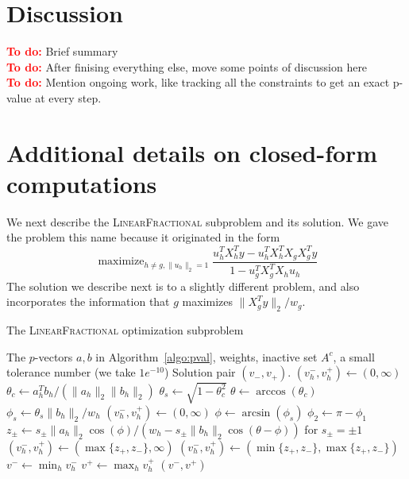 \documentclass{imsart}
\newcommand{\maximize}{\mathop{\mathrm{maximize}}}
\newcommand{\todo}{\textcolor{red}{\textbf{To do: }}}
\newcommand{\norm}[1]{\lVert #1 \rVert}
\begin{document}




\section{Discussion}
\label{sec:discuss}

\todo Brief summary \\
\todo After finising everything else, move some points of discussion
here \\
\todo Mention ongoing work, like tracking all the constraints to
get an exact p-value at every step. \\

\newpage


%


\newpage

\appendix
\section{Additional details on closed-form computations}
\label{app:closedform}

We next describe the \textsc{LinearFractional} subproblem and its solution. We
gave the problem this name because it originated in the form
\[
\maximize_{h \neq g, \norm{u_h}_2 = 1} \frac{u_h^TX_h^Ty - u_h^TX_h^TX_gX_g^Ty}
{1 - u_g^TX_g^TX_hu_h}
\]
The solution we describe next is to a slightly different problem, and
also incorporates the information that $g$ maximizes $\norm{X_g^Ty}_2/w_g$.

\begin{algorithm}
 \caption{The \textsc{LinearFractional} optimization subproblem}
 \label{algo:linfrac}
 \begin{algorithmic}
   \REQUIRE The $p$-vectors $a, b$ in Algorithm~\ref{algo:pval}, weights, inactive set $A^c$, a small tolerance number
(we take $1e^{-10}$)
   \ENSURE Solution pair $(v_-, v_+)$.
     \IF{$\norm{b_h}_2 == 0$ or $\norm{a_h}_2/\norm{b_h}_2 < \text{tol}$}
       \STATE $(v^-_h, v^+_h) \gets (0, \infty)$
     \ELSE
       \STATE $\theta_c \gets a_h^Tb_h/(\norm{a_h}_2 \norm{b_h}_2)$
       \STATE $\theta_s \gets \sqrt{1-\theta_c^2}$
       \STATE $\theta \gets \arccos (\theta_c)$
       \STATE $\phi_s \gets \theta_s \norm{b_h}_2 / w_h$
         \STATE $(v^-_h, v^+_h) \gets (0, \infty)$
       \ELSE
         \STATE $\phi \gets \arcsin(\phi_s)$
         \STATE $\phi_2 \gets \pi - \phi_1$
         \STATE $z_\pm \gets s_\pm \norm{a_h}_2 \cos(\phi) /(w_h - s_\pm \norm{b_h}_2 \cos(\theta - \phi))$ for $s_\pm = \pm 1$
         \IF{$\norm{b_h}_2 < w_h$}
           \STATE $(v_h^-, v_h^+) \gets (\max \{ z_+, z_- \}, \infty)$
         \ELSE
           \STATE $(v_h^-, v_h^+) \gets (\min \{ z_+, z_- \}, \max \{ z_+, z_- \})$
         \ENDIF
       \ENDIF
     \ENDIF
   \ENDFOR
   \STATE $v^- \gets \min_h v_h^-$
   \STATE $v^+ \gets \max_h v_h^+$
   \RETURN $(v^-, v^+)$
 \end{algorithmic}
\end{algorithm}
\end{document}
